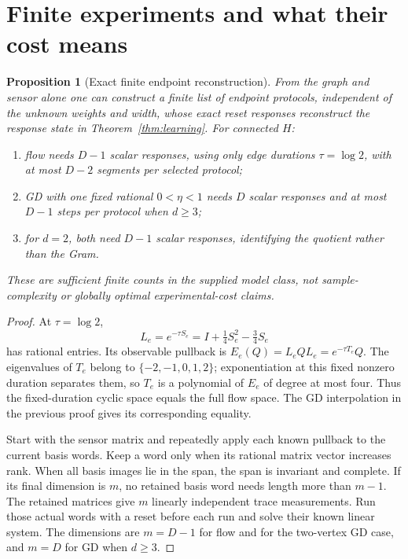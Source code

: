 \documentclass[11pt]{article}
\newtheorem{proposition}[theorem]{Proposition}
\theoremstyle{remark}
\begin{document}
\section{Finite experiments and what their cost means}
\label{sec:experiments}

\begin{proposition}[Exact finite endpoint reconstruction]
\label{prop:endpoints}
From the graph and sensor alone one can construct a finite list of endpoint protocols, independent of the unknown weights and width, whose exact reset responses reconstruct the response state in Theorem~\ref{thm:learning}. For connected $H$:
\begin{enumerate}
\item flow needs $D-1$ scalar responses, using only edge durations $\tau=\log2$, with at most $D-2$ segments per selected protocol;
\item GD with one fixed rational $0<\eta<1$ needs $D$ scalar responses and at most $D-1$ steps per protocol when $d\geq3$;
\item for $d=2$, both need $D-1$ scalar responses, identifying the quotient rather than the Gram.
\end{enumerate}
These are sufficient finite counts in the supplied model class, not sample-complexity or globally optimal experimental-cost claims.
\end{proposition}

\begin{proof}
At $\tau=\log2$,
\[
 L_e=e^{-\tau S_e}=I+\tfrac14S_e^2-\tfrac34S_e
\]
has rational entries. Its observable pullback is $E_e(Q)=L_eQL_e=e^{-\tau T_e}Q$. The eigenvalues of $T_e$ belong to $\{-2,-1,0,1,2\}$; exponentiation at this fixed nonzero duration separates them, so $T_e$ is a polynomial of $E_e$ of degree at most four. Thus the fixed-duration cyclic space equals the full flow space. The GD interpolation in the previous proof gives its corresponding equality.

Start with the sensor matrix and repeatedly apply each known pullback to the current basis words. Keep a word only when its rational matrix vector increases rank. When all basis images lie in the span, the span is invariant and complete. If its final dimension is $m$, no retained basis word needs length more than $m-1$. The retained matrices give $m$ linearly independent trace measurements. Run those actual words with a reset before each run and solve their known linear system. The dimensions are $m=D-1$ for flow and for the two-vertex GD case, and $m=D$ for GD when $d\geq3$.
\end{proof}
\end{document}
